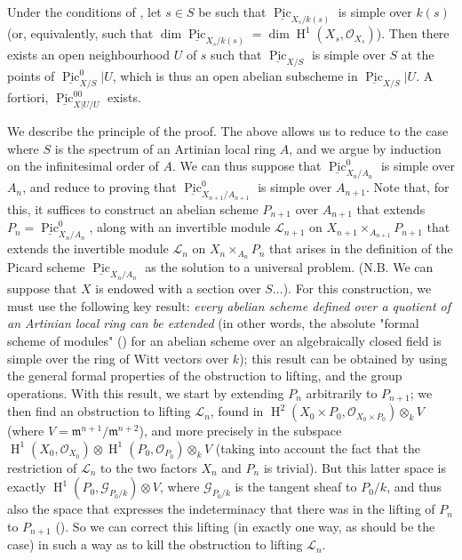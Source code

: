 \begin{theorem}\label{fga3.vi-3-theorem-3.5}
    Under the conditions of , let $s\in S$ be such that $\underline{\operatorname{Pic}}_{X_s/k(s)}$ is simple over $k(s)$ (or, equivalently, such that $\dim\underline{\operatorname{Pic}}_{X_s/k(s)}=\dim\operatorname{H}^1(X_s,\mathcal{O}_{X_s})$).
    Then there exists an open neighbourhood $U$ of $s$ such that $\underline{\operatorname{Pic}}_{X/S}$ is simple over $S$ at the points of $\underline{\operatorname{Pic}}_{X/S}^0|U$, which is thus an open abelian subscheme in $\underline{\operatorname{Pic}}_{X/S}|U$.
    A fortiori, $\underline{\operatorname{Pic}}_{X|U/U}^{00}$ exists.
\end{theorem}

\begin{cproof}
    We describe the principle of the proof.
    The above allows us to reduce to the case where $S$ is the spectrum of an Artinian local ring $A$, and we argue by induction on the infinitesimal order of $A$.
    We can thus suppose that $\underline{\operatorname{Pic}}_{X_n/A_n}^0$ is simple over $A_n$, and reduce to proving that $\underline{\operatorname{Pic}}_{X_{n+1}/A_{n+1}}^0$ is simple over $A_{n+1}$.
    Note that, for this, it suffices to construct an abelian scheme $P_{n+1}$ over $A_{n+1}$ that extends $P_n=\underline{\operatorname{Pic}}_{X_n/A_n}^0$, along with an invertible module $\mathcal{L}_{n+1}$ on $X_{n+1}\times_{A_{n+1}}P_{n+1}$ that extends the invertible module $\mathcal{L}_n$ on $X_n\times_{A_n}P_n$ that arises in the definition of the Picard scheme $\underline{\operatorname{Pic}}_{X_n/A_n}$ as the solution to a universal problem.
    (N.B. We can suppose that $X$ is endowed with a section over $S$...).
    For this construction, we must use the following key result: \emph{every abelian scheme defined over a quotient of an Artinian local ring can be extended} (in other words, the absolute "formal scheme of modules" () for an abelian scheme over an algebraically closed field is simple over the ring of Witt vectors over $k$);
    this result can be obtained by using the general formal properties of the obstruction to lifting, and the group operations.
    With this result, we start by extending $P_n$ arbitrarily to $P_{n+1}$;
    we then find an obstruction to lifting $\mathcal{L}_n$, found in $\operatorname{H}^2(X_0\times P_0,\mathcal{O}_{X_0\times P_0})\otimes_k V$ (where $V=\mathfrak{m}^{n+1}/\mathfrak{m}^{n+2}$), and more precisely in the subspace $\operatorname{H}^1(X_0,\mathcal{O}_{X_0})\otimes\operatorname{H}^1(P_0,\mathcal{O}_{P_0})\otimes_k V$ (taking into account the fact that the restriction of $\mathcal{L}_n$ to the two factors $X_n$ and $P_n$ is trivial).
    But this latter space is exactly $\operatorname{H}^1(P_0,\mathcal{G}_{P_0/k})\otimes V$, where $\mathcal{G}_{P_0/k}$ is the tangent sheaf to $P_0/k$, and thus also the space that expresses the indeterminacy that there was in the lifting of $P_n$ to $P_{n+1}$ ().
    So we can correct this lifting (in exactly one way, as should be the case) in such a way as to kill the obstruction to lifting $\mathcal{L}_n$.
\end{cproof}

